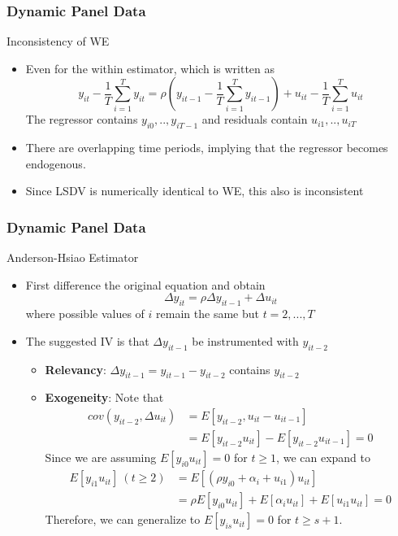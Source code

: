 \documentclass{beamer}
\begin{document}
\begin{frame}
\frametitle{Dynamic Panel Data}
Inconsistency of WE
\begin{itemize}
\item Even for the within estimator, which is written as
\[
y_{it}-\frac{1}{T}\sum_{i=1}^Ty_{it}=\rho\left(y_{it-1}-\frac{1}{T}\sum_{i=1}^Ty_{it-1}\right)+u_{it}-\frac{1}{T}\sum_{i=1}^Tu_{it}
\]
The regressor contains $y_{i0},..,y_{iT-1}$ and residuals contain $u_{i1},..,u_{iT}$
\item There are overlapping time periods, implying that the regressor becomes endogenous.
\item Since LSDV is numerically identical to WE, this also is inconsistent
\end{itemize}
\end{frame}

\begin{frame}
\frametitle{Dynamic Panel Data}
Anderson-Hsiao Estimator
\begin{itemize}
\item First difference the original equation and obtain
\[
\Delta y_{it}=\rho\Delta  y_{it-1} +\Delta u_{it}
\]
where possible values of $i$ remain the same but $t=2,...,T$
\item The suggested IV is that $\Delta y_{it-1}$ be instrumented with $y_{it-2}$
\begin{itemize}
\item \textbf{Relevancy}: $\Delta y_{it-1}= y_{it-1}-y_{it-2}$ contains $y_{it-2}$
\item \textbf{Exogeneity}: Note that
\begin{align*}
cov(y_{it-2},\Delta u_{it})&=E[y_{it-2}, u_{it}-u_{it-1}]\\
&=E[y_{it-2}u_{it}]-E[y_{it-2}u_{it-1}]=0
\end{align*}
Since we are assuming $E[y_{i0}u_{it}]=0$ for $t\geq1$, we can expand to
\begin{align*}
E[y_{i1}u_{it}]\ (t\geq 2)&=E[(\rho y_{i0}+\alpha_i +u_{i1})u_{it}]\\
&=\rho E[y_{i0}u_{it}]+E[\alpha_iu_{it}]+E[u_{i1}u_{it}]=0
\end{align*}
Therefore, we can generalize to $E[y_{is}u_{it}]=0$ for $t\geq s+1$. 
\end{itemize}
\end{itemize}
\end{frame}
\end{document}
